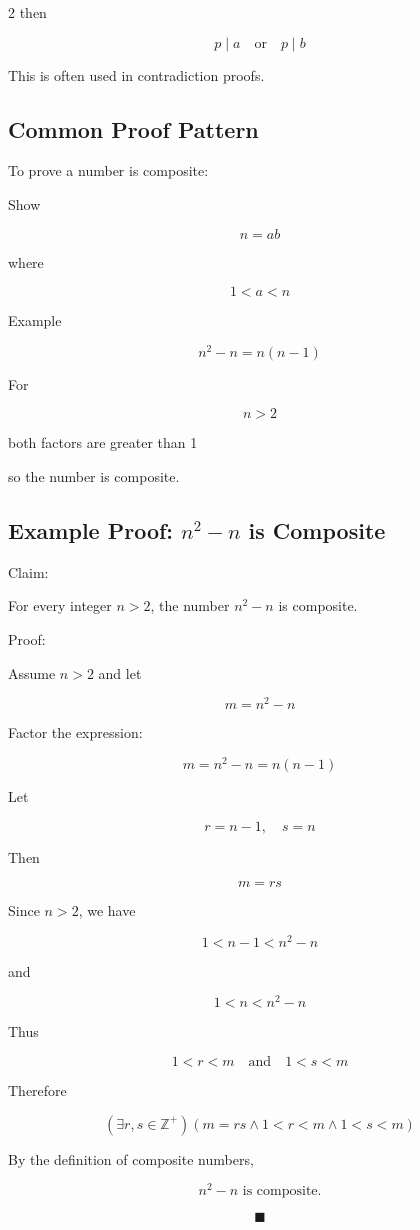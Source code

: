 \documentclass[9pt]{article}
\begin{document}
\begin{multicols}{2}
then

\[
p\mid a \quad \text{or} \quad p\mid b
\]

This is often used in contradiction proofs.

\subsection*{Common Proof Pattern}

To prove a number is composite:

Show

\[
n = ab
\]

where

\[
1<a<n
\]

Example

\[
n^2-n = n(n-1)
\]

For

\[
n>2
\]

both factors are greater than 1

so the number is composite.

\subsection*{Example Proof: $n^2 - n$ is Composite}

Claim:

For every integer $n>2$, the number $n^2-n$ is composite.

Proof:

Assume $n>2$ and let

\[
m = n^2-n
\]

Factor the expression:

\[
m = n^2-n = n(n-1)
\]

Let

\[
r = n-1, \quad s = n
\]

Then

\[
m = rs
\]

Since $n>2$, we have

\[
1 < n-1 < n^2-n
\]

and

\[
1 < n < n^2-n
\]

Thus

\[
1 < r < m \quad \text{and} \quad 1 < s < m
\]

Therefore

\[
(\exists r,s \in \mathbb{Z}^+)
(m = rs \land 1 < r < m \land 1 < s < m)
\]

By the definition of composite numbers,

\[
n^2 - n \text{ is composite.}
\]

\[
\blacksquare
\]
\end{multicols}
\end{document}
